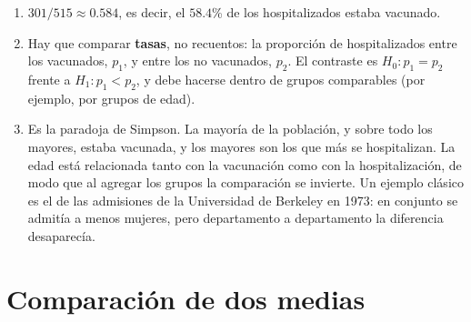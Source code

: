 \documentclass[
  spanish,
  a4paper,
]{scrreport}
\theoremstyle{definition}
\theoremstyle{remark}
\begin{document}
\begin{tcolorbox}[enhanced jigsaw, arc=.35mm, bottomrule=.15mm, bottomtitle=1mm, breakable, colback=white, colbacktitle=quarto-callout-tip-color!10!white, colframe=quarto-callout-tip-color-frame, coltitle=black, left=2mm, leftrule=.75mm, opacityback=0, opacitybacktitle=0.6, rightrule=.15mm, title=\textcolor{quarto-callout-tip-color}{\faLightbulb}\hspace{0.5em}{Solución}, titlerule=0mm, toprule=.15mm, toptitle=1mm]

\begin{enumerate}
\def\labelenumi{\alph{enumi}.}
\item
  \(301/515\approx 0.584\), es decir, el \(58.4\)\% de los
  hospitalizados estaba vacunado.
\item
  Hay que comparar \textbf{tasas}, no recuentos: la proporción de
  hospitalizados entre los vacunados, \(p_1\), y entre los no vacunados,
  \(p_2\). El contraste es \(H_0: p_1=p_2\) frente a \(H_1: p_1<p_2\), y
  debe hacerse dentro de grupos comparables (por ejemplo, por grupos de
  edad).
\item
  Es la paradoja de Simpson. La mayoría de la población, y sobre todo
  los mayores, estaba vacunada, y los mayores son los que más se
  hospitalizan. La edad está relacionada tanto con la vacunación como
  con la hospitalización, de modo que al agregar los grupos la
  comparación se invierte. Un ejemplo clásico es el de las admisiones de
  la Universidad de Berkeley en 1973: en conjunto se admitía a menos
  mujeres, pero departamento a departamento la diferencia desaparecía.
\end{enumerate}

\end{tcolorbox}

\section{Comparación de dos medias}\label{comparaciuxf3n-de-dos-medias}
\end{document}
